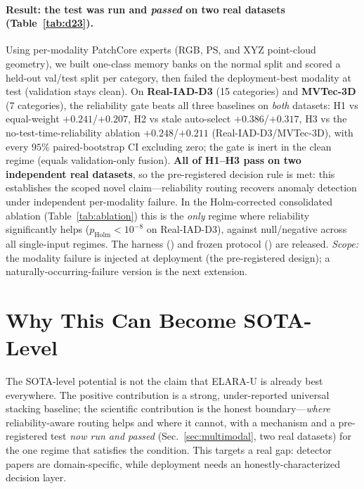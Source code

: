 \documentclass[11pt,titlepage]{article}
\newcommand{\systemu}{ELARA-U}
\begin{document}
\paragraph{Result: the test was run and \emph{passed} on two real datasets
(Table~\ref{tab:d23}).} Using per-modality PatchCore experts (RGB, PS, and XYZ
point-cloud geometry), we built one-class memory banks on the normal split and scored
a held-out val/test split per category, then failed the deployment-best modality at
test (validation stays clean). On \textbf{Real-IAD-D3} (15 categories) and
\textbf{MVTec-3D} (7 categories), the reliability gate beats all three baselines on
\emph{both} datasets: H1 vs equal-weight $+0.241$/$+0.207$, H2 vs stale auto-select
$+0.386$/$+0.317$, H3 vs the no-test-time-reliability ablation $+0.248$/$+0.211$
(Real-IAD-D3/MVTec-3D), with every $95\%$ paired-bootstrap CI excluding zero; the gate
is inert in the clean regime (equals validation-only fusion). \textbf{All of H1--H3
pass on two independent real datasets}, so the pre-registered decision rule is met:
this establishes the scoped novel claim---reliability routing recovers anomaly
detection under independent per-modality failure. In the Holm-corrected consolidated
ablation (Table~\ref{tab:ablation}) this is the \emph{only} regime where reliability
significantly helps ($p_{\mathrm{Holm}}<10^{-8}$ on Real-IAD-D3), against null/negative
across all single-input regimes. The harness
() and frozen protocol
() are released.
\emph{Scope:} the modality failure is injected at deployment (the pre-registered
design); a naturally-occurring-failure version is the next extension.

\section{Why This Can Become SOTA-Level}

The SOTA-level potential is not the claim that \systemu{} is already best
everywhere. The positive contribution is a strong, under-reported universal stacking
baseline; the scientific contribution is the honest boundary---\emph{where}
reliability-aware routing helps and where it cannot, with a mechanism and a
pre-registered test \emph{now run and passed} (Sec.~\ref{sec:multimodal}, two real
datasets) for the one regime that satisfies the condition. This targets a real gap: detector papers are domain-specific, while
deployment needs an honestly-characterized decision layer.
\end{document}
